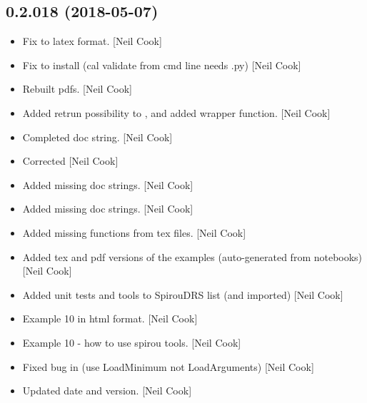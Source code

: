 \documentclass[a4paper,10pt,english]{report}
\begin{document}
\subsection{0.2.018 (2018-05-07)}
\label{\detokenize{misc/changelog:id442}}\begin{itemize}
\item {} 
Fix to latex format. {[}Neil Cook{]}

\item {} 
Fix to install (cal validate from cmd line needs .py) {[}Neil Cook{]}

\item {} 
Rebuilt pdfs. {[}Neil Cook{]}

\item {} 
Added retrun possibility to , and added
 wrapper function. {[}Neil Cook{]}

\item {} 
Completed doc string. {[}Neil Cook{]}

\item {} 
Corrected  {[}Neil Cook{]}

\item {} 
Added missing doc strings. {[}Neil Cook{]}

\item {} 
Added missing doc strings. {[}Neil Cook{]}

\item {} 
Added missing functions from tex files. {[}Neil Cook{]}

\item {} 
Added tex and pdf versions of the examples (auto-generated from
notebooks) {[}Neil Cook{]}

\item {} 
Added unit tests and tools to SpirouDRS  list (and imported)
{[}Neil Cook{]}

\item {} 
Example 10 in html format. {[}Neil Cook{]}

\item {} 
Example 10 - how to use spirou tools. {[}Neil Cook{]}

\item {} 
Fixed bug in  (use LoadMinimum not LoadArguments) {[}Neil
Cook{]}

\item {} 
Updated date and version. {[}Neil Cook{]}


\end{itemize}
\end{document}
